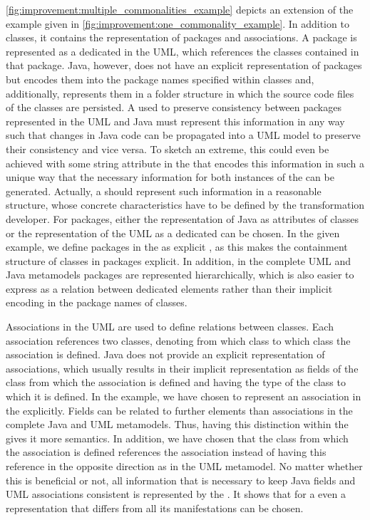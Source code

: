 \autoref{fig:improvement:multiple_commonalities_example} depicts an extension of the example given in \autoref{fig:improvement:one_commonality_example}.
In addition to classes, it contains the representation of packages and associations.
A package is represented as a dedicated \metaclass in the \gls{UML}, which references the classes contained in that package.
Java, however, does not have an explicit representation of packages but encodes them into the package names specified within classes and, additionally, represents them in a folder structure in which the source code files of the classes are persisted.
A \conceptmetamodel used to preserve consistency between packages represented in the \gls{UML} and Java must represent this information in any way such that changes in Java code can be propagated into a \gls{UML} model to preserve their consistency and vice versa.
To sketch an extreme, this could even be achieved with some string attribute in the \conceptmetamodel that encodes this information in such a unique way that the necessary information for both instances of the \concretemetamodels can be generated.
Actually, a \conceptmetamodel should represent such information in a reasonable structure, whose concrete characteristics have to be defined by the transformation developer.
For packages, either the representation of Java as attributes of classes or the representation of the \gls{UML} as a dedicated \metaclass can be chosen.
In the given example, we define packages in the \conceptmetamodel as explicit \metaclasses, as this makes the containment structure of classes in packages explicit.
In addition, in the complete \gls{UML} and Java metamodels packages are represented hierarchically, which is also easier to express as a relation between dedicated elements rather than their implicit encoding in the package names of classes.

Associations in the \gls{UML} are used to define relations between classes.
Each association references two classes, denoting from which class to which class the association is defined.
Java does not provide an explicit representation of associations, which usually results in their implicit representation as fields of the class from which the association is defined and having the type of the class to which it is defined.
In the example, we have chosen to represent an association in the \conceptmetamodel explicitly.
Fields can be related to further elements than associations in the complete Java and \gls{UML} metamodels.
Thus, having this distinction within the \conceptmetamodel gives it more semantics.
In addition, we have chosen that the class from which the association is defined references the association instead of having this reference in the opposite direction as in the \gls{UML} metamodel.
No matter whether this is beneficial or not, all information that is necessary to keep Java fields and \gls{UML} associations consistent is represented by the \conceptmetamodel.
It shows that for a \conceptmetamodel even a representation that differs from all its manifestations can be chosen.

